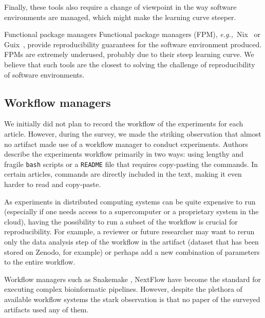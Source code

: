 \documentclass[sigconf,natbib=false]{acmart}
\newcommand{\eg}{\emph{e.g.,}}
\newcommand{\fmc}[1]{{\color{magenta} #1}} %
\begin{document}
Finally, these tools also require a change of viewpoint in the way software environments are managed, which might make the learning curve steeper. %

\begin{lesson}{Functional package managers}{}
  Functional package managers (FPM), \eg\ Nix\ \cite{dolstra_nix_2004} or Guix\ \cite{courtes_functional_2013}, provide reproducibility guarantees for the software environment produced.
  FPMs are extremely underused, probably due to their steep learning curve.
  We believe that such tools are the closest to solving the challenge of reproducibility of software environments.
\end{lesson}

\subsection{Workflow managers}\label{sec:sop:workflow}

We initially did not plan to record the workflow of the experiments for each article. 
However, during the survey, we made the striking observation that almost no artifact made use of a workflow manager to conduct experiments. 
Authors describe the experiments workflow primarily in two ways: 
using lengthy and fragile \texttt{bash} scripts or a \texttt{README} file that requires copy-pasting the commands.
In certain articles, commands are directly included in the text, making it even harder to read and copy-paste.

As experiments in distributed computing systems can be quite expensive to run (especially if one needs access to a supercomputer or a proprietary system in the cloud), having the possibility to run a subset of the workflow is crucial for reproducibility.
For example, a reviewer or future researcher may want to rerun only the data analysis step of the workflow in the artifact (dataset that has been stored on Zenodo, for example) or perhaps add a new combination of parameters to the entire workflow. 

Workflow managers \cite{wratten2021reproducible} such as Snakemake \cite{koster2012snakemake}, NextFlow \cite{di2017nextflow} have become the standard for executing complex bioinformatic pipelines.
However, despite the plethora of available workflow systems \cite{rafael_ferreira_da_silva_2023_7750670, deelman2015pegasus, amstutz2016common, strozzi2019scalable, vivian2017toil} the stark observation is that no paper of the surveyed artifacts used any of them.
\end{document}
